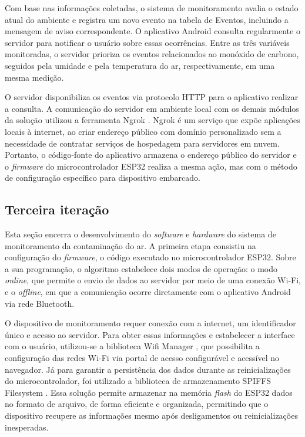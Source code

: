 Com base nas informações coletadas, o sistema de monitoramento avalia o estado atual do ambiente e registra um novo evento na 
tabela de Eventos, incluindo a mensagem de aviso correspondente. O aplicativo Android consulta regularmente o servidor para notificar 
o usuário sobre essas ocorrências. Entre as três variáveis monitoradas, o servidor prioriza os eventos relacionados ao monóxido de 
carbono, seguidos pela umidade e pela temperatura do ar, respectivamente, em uma mesma medição. 

O servidor disponibiliza os eventos via protocolo HTTP para o aplicativo realizar a consulta. A comunicação do servidor em ambiente local com os 
demais módulos da solução utilizou a ferramenta Ngrok \cite{ngrok}. Ngrok é um serviço que expõe aplicações 
locais à internet, ao criar endereço público com domínio personalizado sem a necessidade de contratar serviços de 
hospedagem para servidores em nuvem. Portanto, o código-fonte do aplicativo armazena o endereço público do servidor e o \textit{firmware} do microcontrolador 
ESP32 realiza a mesma ação, mas com o método de configuração específico para dispositivo embarcado.

\subsection{Terceira iteração}\label{ExecAtv3It}

Esta seção encerra o desenvolvimento do \textit{software} e \textit{hardware} do sistema de monitoramento da contaminação do ar. A primeira etapa consistiu na configuração 
do \textit{firmware}, o código executado no microcontrolador ESP32. Sobre a sua programação, o algoritmo estabelece dois modos de operação: o modo \textit{online}, que permite 
o envio de dados ao servidor por meio de uma conexão Wi-Fi, e o \textit{offline}, em que a comunicação ocorre diretamente com o aplicativo Android via rede Bluetooth.

O dispositivo de monitoramento requer conexão com a internet, um identificador único e acesso ao servidor. Para obter essas informações e estabelecer a interface com 
o usuário, utilizou-se a biblioteca Wifi Manager \cite{tzapu-wifimanager}, que possibilita a configuração das redes Wi-Fi via  portal de acesso configurável e acessível no navegador. Já para 
garantir a persistência dos dados durante as reinicializações do microcontrolador, foi utilizado a biblioteca de armazenamento SPIFFS Filesystem \cite{spiffs}. Essa solução permite armazenar
na memória \textit{flash} do ESP32 dados no formato de arquivo, de forma eficiente e organizada, permitindo que o dispositivo recupere as informações mesmo após desligamentos ou reinicializações inesperadas.

